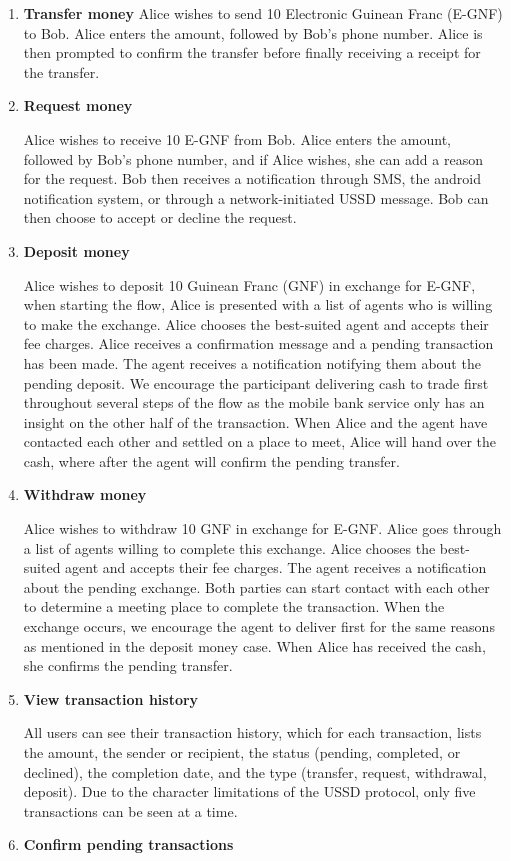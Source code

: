 \documentclass[11pt, a4paper]{article}
\begin{document}
\begin{enumerate}
  \item \textbf{Transfer money}
  Alice wishes to send 10 Electronic Guinean Franc (E-GNF) to Bob. Alice enters the amount, followed by Bob's phone number. Alice is then prompted to confirm the transfer before finally receiving a receipt for the transfer.
  \item \textbf{Request money}

  Alice wishes to receive 10 E-GNF from Bob. Alice enters the amount, followed by Bob's phone number, and if Alice wishes, she can add a reason for the request. Bob then receives a notification through SMS, the android notification system, or through a network-initiated USSD message. Bob can then choose to accept or decline the request.
  \item \textbf{Deposit money}

  Alice wishes to deposit 10 Guinean Franc (GNF) in exchange for E-GNF, when starting the flow, Alice is presented with a list of agents who is willing to make the exchange. Alice chooses the best-suited agent and accepts their fee charges. Alice receives a confirmation message and a pending transaction has been made. The agent receives a notification notifying them about the pending deposit. We encourage the participant delivering cash to trade first throughout several steps of the flow as the mobile bank service only has an insight on the other half of the transaction. When Alice and the agent have contacted each other and settled on a place to meet, Alice will hand over the cash, where after the agent will confirm the pending transfer.
  \item \textbf{Withdraw money}

  Alice wishes to withdraw 10 GNF in exchange for E-GNF. Alice goes through a list of agents willing to complete this exchange. Alice chooses the best-suited agent and accepts their fee charges. The agent receives a notification about the pending exchange. Both parties can start contact with each other to determine a meeting place to complete the transaction. When the exchange occurs, we encourage the agent to deliver first for the same reasons as mentioned in the deposit money case. When Alice has received the cash, she confirms the pending transfer.
  \item \textbf{View transaction history}

  All users can see their transaction history, which for each transaction, lists the amount, the sender or recipient, the status (pending, completed, or declined), the completion date, and the type (transfer, request, withdrawal, deposit). Due to the character limitations of the USSD protocol, only five transactions can be seen at a time.
  \item \textbf{Confirm pending transactions}


\end{enumerate}
\end{document}
